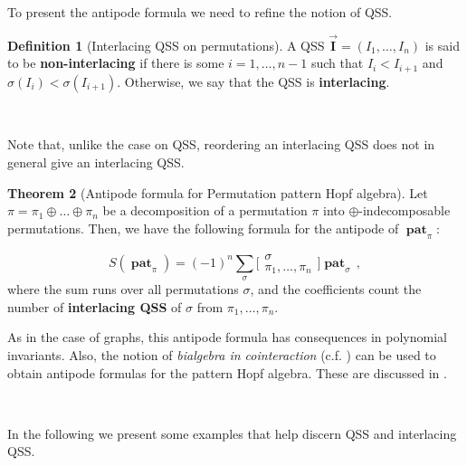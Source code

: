 \documentclass[12pt, reqno]{amsart}
\theoremstyle{definition}
\newtheorem{thm}{Theorem}[section]
\newtheorem{defin}[thm]{Definition}
\newcommand{\III}{\vec{\mathbf{I}}}
\DeclareMathOperator{\pat}{\mathbf{pat}}
\begin{document}
To present the antipode formula we need to refine the notion of QSS.
\begin{defin}[Interlacing QSS on permutations]
A QSS $\III = (I_1, \dots, I_n)$ is said to be \textbf{non-interlacing} if there is some $i=1, \dots, n-1$ such that $I_i < I_{i+1}$ and $\sigma(I_i) < \sigma(I_{i+1})$.
Otherwise, we say that the QSS is \textbf{interlacing}. 

\

Note that, unlike the case on QSS, reordering an interlacing QSS does not in general give an interlacing QSS.
\end{defin}


\begin{thm}[Antipode formula for Permutation pattern Hopf algebra]\label{thm:antipode_perms_intro}
Let $\pi = \pi_1\oplus \dots \oplus \pi_n$ be a decomposition of a permutation $\pi$ into $\oplus$-indecomposable permutations.
Then, we have the following formula for the antipode of $\pat_{\pi}$:

$$S(\pat_{\pi}) = (-1)^n \sum_{\sigma} \bigl[\!\begin{smallmatrix} \sigma \\ \pi_1, \dots, \pi_n \end{smallmatrix}\!\bigr] \pat_{\sigma}\, ,$$
where the sum runs over all permutations $\sigma$, and the coefficients count the number of \textbf{interlacing QSS} of $\sigma$ from $\pi_1, \dots, \pi_n$.
\end{thm}

As in the case of graphs, this antipode formula has consequences in polynomial invariants. Also, the notion of \emph{bialgebra in cointeraction} (c.f. \cite{Foissy}) can be used to obtain antipode formulas for the pattern Hopf algebra.
These are discussed in \cite{penaguiao2023polynomial}.

\

In the following we present some examples that help discern QSS and interlacing QSS.

\
\end{document}
